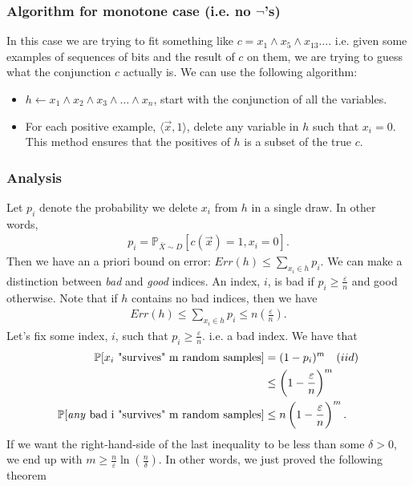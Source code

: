 \documentclass[12pt, letterpaper]{article}
\numberwithin{equation}{section} %
\newcommand{\mb}{\mathbb}
\newcommand{\ve}{\varepsilon}
\theoremstyle{definition}
\theoremstyle{remark}
\begin{document}
\subsubsection[Algorithm for monotone case]{Algorithm for monotone case (i.e. no $\lnot$'s)}

In this case we are trying to fit something like $c = x_1\wedge x_5 \wedge x_{13} \ldots$. i.e. given some examples of sequences of bits and the result of $c$ on them, we are trying to guess what the conjunction $c$ actually is.
We can use the following algorithm:
\begin{itemize}
    \item $h \leftarrow x_1\wedge x_2 \wedge x_3\wedge \ldots \wedge x_n$, start with the conjunction of all the variables.
    \item For each positive example, $\langle \vec x, 1 \rangle$, delete any variable in $h$ such that $x_i=0$.\\
    This method ensures that the positives of $h$ is a subset of the true $c$.
\end{itemize}


\subsubsection*{Analysis}

Let $p_i$ denote the probability we delete $x_i$ from $h$ in a single draw. In other words,
\begin{align}
    p_i = \mb P_{\bar X\sim D}[c(\vec x) = 1, x_i=0].
\end{align}
Then we have an a priori bound on error: $Err(h) \leq \sum\limits_{x_i\in h} p_i$.
 We can make a distinction between \emph{bad} and \emph{good} indices. 
 An index, $i$, is bad if $p_i\geq \frac{\ve}{n}$ and good otherwise. 
 Note that if $h$ contains no bad indices, then we have
\begin{align}
    Err(h) \leq \sum\limits_{x_i\in h} p_i \leq n\left(\frac{\ve}{n}\right).
\end{align}
Let's fix some index, $i$, such that $p_i\geq \frac\ve n$. i.e. a bad index. We have that
\begin{align}
    \mb P[x_i\textrm{ "survives" m random samples}] &= (1 - p_i)^m \quad (iid)\\
    & \leq \left(1 - \frac\ve n\right)^m \\
    \mb P[\textrm{\emph{any} bad i "survives" m random samples}] &\leq n\left(1 - \frac\ve n\right)^m.
\end{align}
If we want the right-hand-side of the last inequality to be less than some $\delta>0$, we end up with $m \geq \frac n\ve \ln\left(\frac n\delta\right)$. 
In other words, we just proved the following theorem
\end{document}
